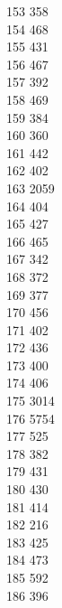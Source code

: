 { 153	358 \\
 154	468 \\
 155	431 \\
 156	467 \\
 157	392 \\
 158	469 \\
 159	384 \\
 160	360 \\
 161	442 \\
 162	402 \\
 163	2059 \\
 164	404 \\
 165	427 \\
 166	465 \\
 167	342 \\
 168	372 \\
 169	377 \\
 170	456 \\
 171	402 \\
 172	436 \\
 173	400 \\
 174	406 \\
 175	3014 \\
 176	5754 \\
 177	525 \\
 178	382 \\
 179	431 \\
 180	430 \\
 181	414 \\
 182	216 \\
 183	425 \\
 184	473 \\
 185	592 \\
 186	396 \\
}
